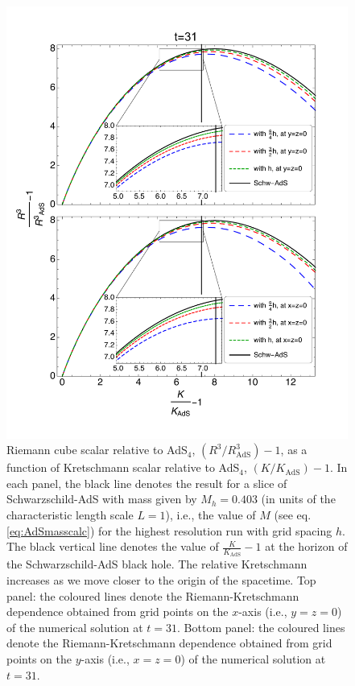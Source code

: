 \documentclass[a4paper,11pt]{article}
\numberwithin{equation}{section}
\begin{document}
\begin{figure}[t!]
        \centering
        \includegraphics[width=5.0in,clip=true]{plots/bulkplots/compare_res/relriemanncube-relkretsch/combined_withzoom_fullplotrelRieCubeofrelkretschallres.pdf}
\parbox{5.0in}{\caption{
Riemann cube scalar relative to AdS$_4$, $(R^3/R^3_{\text{AdS}})-1$, as a function of Kretschmann scalar relative to AdS$_4$, $(K/K_{\text{AdS}})-1$.
In each panel, the black line denotes the result for a slice of Schwarzschild-AdS with mass given by $M_h=0.403$ (in units of the characteristic length scale $L=1$), i.e., the value of $M$ (see eq. \eqref{eq:AdSmasscalc}) for the highest resolution run with grid spacing $h$. The black vertical line denotes the value of $\frac{K}{K_{\text{AdS}}}-1$ at the horizon of the Schwarzschild-AdS black hole. The relative Kretschmann increases as we move closer to the origin of the spacetime.
Top panel: the coloured lines denote the Riemann-Kretschmann dependence obtained from grid points on the $x$-axis (i.e., $y=z=0$) of the numerical solution at $t=31$. 
Bottom panel: the coloured lines denote the Riemann-Kretschmann dependence obtained from grid points on the $y$-axis (i.e., $x=z=0$) of the numerical solution at $t=31$.
        }\label{fig:relRiemanncube-relKretschmann-comparison-SchwAdS}}
\end{figure}
\end{document}
